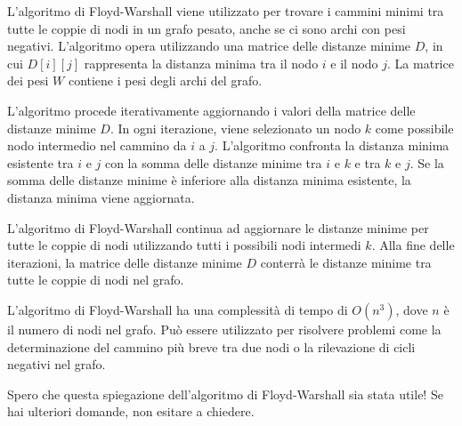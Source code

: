 L'algoritmo di Floyd-Warshall viene utilizzato per trovare i cammini minimi tra tutte le coppie di nodi in un grafo pesato, anche se ci sono archi con pesi negativi. L'algoritmo opera utilizzando una matrice delle distanze minime $D$, in cui $D[i][j]$ rappresenta la distanza minima tra il nodo $i$ e il nodo $j$. La matrice dei pesi $W$ contiene i pesi degli archi del grafo.

L'algoritmo procede iterativamente aggiornando i valori della matrice delle distanze minime $D$. In ogni iterazione, viene selezionato un nodo $k$ come possibile nodo intermedio nel cammino da $i$ a $j$. L'algoritmo confronta la distanza minima esistente tra $i$ e $j$ con la somma delle distanze minime tra $i$ e $k$ e tra $k$ e $j$. Se la somma delle distanze minime è inferiore alla distanza minima esistente, la distanza minima viene aggiornata.

L'algoritmo di Floyd-Warshall continua ad aggiornare le distanze minime per tutte le coppie di nodi utilizzando tutti i possibili nodi intermedi $k$. Alla fine delle iterazioni, la matrice delle distanze minime $D$ conterrà le distanze minime tra tutte le coppie di nodi nel grafo.

L'algoritmo di Floyd-Warshall ha una complessità di tempo di $O(n^3)$, dove $n$ è il numero di nodi nel grafo. Può essere utilizzato per risolvere problemi come la determinazione del cammino più breve tra due nodi o la rilevazione di cicli negativi nel grafo.

Spero che questa spiegazione dell'algoritmo di Floyd-Warshall sia stata utile! Se hai ulteriori domande, non esitare a chiedere.
